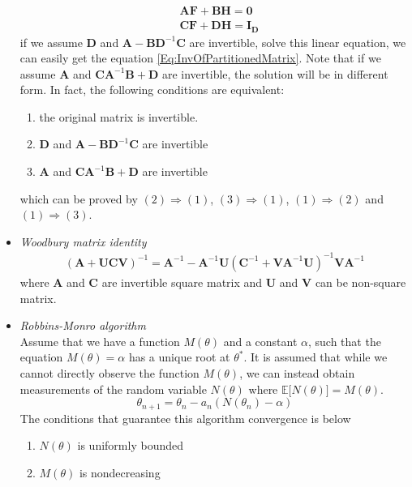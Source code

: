 \documentclass[12pt, a4paper]{article}
\newcommand{\E}{\mathbb{E}}
\begin{document}
\begin{itemize}
\begin{align*}
            &\bm{AF}+\bm{BH}=\bm{0}\\
            &\bm{CF}+\bm{DH}=\bm{I_D}
        \end{align*}
        if we assume $\bm{D}$ and $\bm{A}-\bm{BD}^{-1}\bm{C}$ are invertible, solve this 
        linear equation, we can easily  get the equation \ref{Eq:InvOfPartitionedMatrix}. 
        Note that if we assume $\bm{A}$ and $\bm{CA}^{-1}\bm{B}+\bm{D}$ are invertible, the 
        solution will be in different form. In fact, the following conditions are equivalent:
        \begin{enumerate}
            \item the original matrix is invertible.
            \item $\bm{D}$ and $\bm{A}-\bm{BD}^{-1}\bm{C}$ are invertible
            \item $\bm{A}$ and $\bm{CA}^{-1}\bm{B}+\bm{D}$ are invertible
        \end{enumerate}
        which can be proved by $(2)\Rightarrow (1)$, $(3)\Rightarrow (1)$, 
        $(1)\Rightarrow (2)$ and $(1)\Rightarrow (3)$.
        \item \textit{Woodbury matrix identity}
        \begin{eqnarray}
            \label{eq:Woodbury}
            (\bm{A}+\bm{UCV})^{-1}=\bm{A}^{-1}-\bm{A}^{-1}\bm{U}(\bm{C}^{-1}+\bm{V}\bm{A}^{-1}
            \bm{U})^{-1}\bm{V}\bm{A}^{-1}
        \end{eqnarray}
        where $\bm{A}$ and $\bm{C}$ are invertible square matrix and $\bm{U}$ and $\bm{V}$ can be 
        non-square matrix.
        \item \textit{Robbins-Monro algorithm}\\
        Assume that we have a function $M(\theta)$ and a constant $\alpha$, such that the equation
        $M(\theta)=\alpha$ has a unique root at $\theta^*$. It is assumed that while we cannot 
        directly observe the function $M(\theta)$, we can instead obtain measurements of the
        random variable $N(\theta)$ where $\E\lbrack N(\theta)\rbrack=M(\theta)$.
        \begin{equation}
            \theta_{n+1}=\theta_{n}-a_n(N(\theta_n)-\alpha)
        \end{equation}
        The conditions that guarantee this algorithm convergence is below
        \begin{enumerate}
            \item $N(\theta)$ is uniformly bounded
            \item $M(\theta)$ is nondecreasing

\end{enumerate}
\end{itemize}
\end{document}

